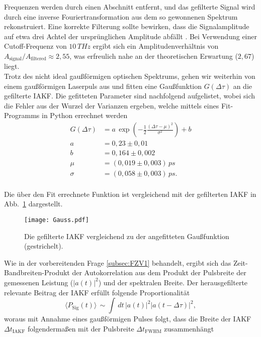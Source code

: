 Frequenzen werden durch einen Abschnitt entfernt, und das gefilterte Signal wird durch eine inverse 
Fouriertransformation aus dem so gewonnenen Spektrum rekonstruiert. Eine korrekte Filterung sollte bewirken, 
dass die Signalamplitude auf etwa drei Achtel der ursprünglichen Amplitude abfällt \cite{Anleitung}. Bei Verwendung einer 
Cutoff-Frequenz von $10\,\si{THz}$ ergibt sich ein Amplitudenverhältnis von 
$A_{\text{signal}}/A_{\text{filtered}} \approx 2,55$, was erfreulich nahe an der theoretischen Erwartung ($2,67$) liegt. \\
Trotz des nicht ideal gaußförmigen optischen Spektrums, gehen wir weiterhin von einem gaußförmigen 
Laserpuls aus und fitten eine Gaußfunktion $G(\Delta\tau)$ an die gefilterte IAKF. 
Die gefitteten Parameter sind nachfolgend aufgelistet, wobei sich die Fehler aus der Wurzel der Varianzen ergeben, 
welche mittels eines Fit-Programms in Python errechnet werden
\begin{align}
    G(\Delta\tau) &= a\,\exp\left(-\frac{1}{2}\frac{(\Delta\tau - \mu)^2}{\sigma^2}\right) + b \\
    a &= 0,23 \pm 0,01 \\
    b &= 0,164 \pm 0,002 \\
    \mu &= (0,019 \pm 0,003)\,\si{ps} \\
    \sigma &= (0,058 \pm 0,003)\,\si{ps}.
\end{align} \,\\
Die über den Fit errechnete Funktion ist vergleichend mit der gefilterten IAKF in Abb.~\ref{fig:gauss}
dargestellt.
\begin{figure}[h!]
    \centering
    \texttt{[image: Gauss.pdf]}
    \caption{\label{fig:gauss}Die gefilterte IAKF vergleichend zu der angefitteten Gaußfunktion (gestrichelt).}
\end{figure}\FloatBarrier
Wie in der vorbereitenden Frage \ref{subsec:FZV1} behandelt, ergibt sich 
das Zeit-Bandbreiten-Produkt der Autokorrelation aus dem Produkt der Pulsbreite 
der gemessenen Leistung ($\left\vert a(t) \right\vert^{2}$) und der spektralen Breite. 
Der herausgefilterte relevante Beitrag der IAKF erfüllt folgende Proportionalität
\begin{equation}
    \langle P_{\text{Sig}}(t) \rangle \,\sim \int\,dt\,\left\vert a(t) \right\vert^{2}\left\vert a(t-\Delta\tau)\right\vert^{2}, 
\end{equation}
woraus mit Annahme eines gaußförmigen Pulses folgt, dass die Breite der IAKF $\Delta t_{\text{IAKF}}$ folgendermaßen 
mit der Pulsbreite $\Delta t_{\text{FWHM}}$ zusammenhängt
